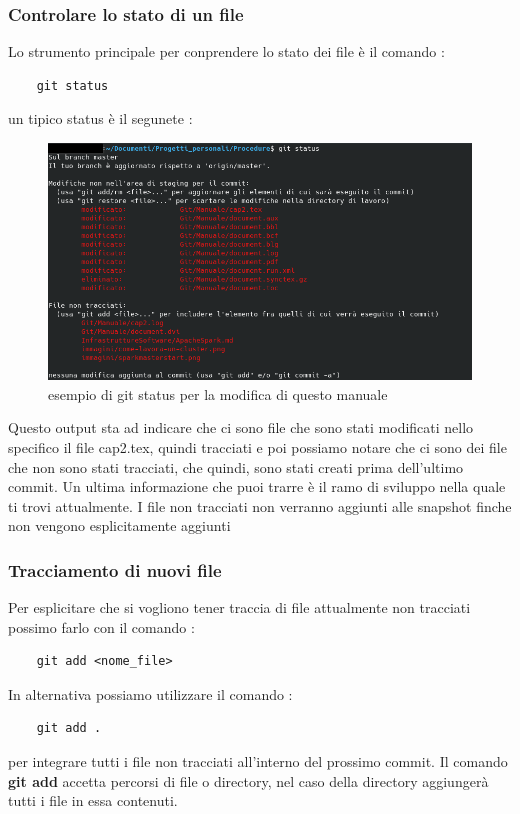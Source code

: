 \subsubsection{Controlare lo stato di un file}
Lo strumento principale per conprendere lo stato dei file è il comando :
\begin{lstlisting}
	git status
\end{lstlisting} 
un tipico status è il segunete :
\begin{figure}[H]
					\centering
					\includegraphics[width=1 \textwidth]{immagini/status.png}
					\subitem \caption{esempio di git status per la modifica di questo manuale}
					\label{json:imm}
\end{figure}
Questo output sta ad indicare che ci sono file che sono stati modificati nello specifico il file cap2.tex, quindi tracciati e poi possiamo notare che ci sono dei file che non sono stati tracciati, che quindi, sono stati creati prima dell'ultimo commit. Un ultima informazione che puoi trarre è il ramo di sviluppo nella quale ti trovi attualmente.
I file non tracciati non verranno aggiunti alle snapshot finche non vengono esplicitamente aggiunti 
\subsubsection{Tracciamento di nuovi file}
Per esplicitare che si vogliono tener traccia di file attualmente non tracciati possimo farlo con il comando : 
\begin{lstlisting}
	git add <nome_file>
\end{lstlisting}
In alternativa possiamo utilizzare il comando :
\begin{lstlisting}
	git add .
\end{lstlisting}
per integrare tutti i file non tracciati all'interno del prossimo commit. Il comando \textbf{git add} accetta percorsi di file o directory, nel caso della directory aggiungerà tutti i file in essa contenuti.
 

